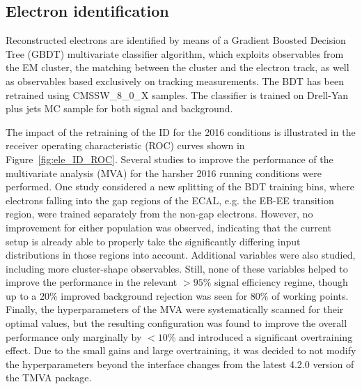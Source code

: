 \subsection{Electron identification}
\label{sec:eleID}

Reconstructed electrons are identified by means of a Gradient Boosted Decision Tree (GBDT) multivariate classifier algorithm, which exploits observables from the EM cluster, the matching between the cluster and the electron track, as well as observables based exclusively on tracking measurements. 
The BDT has been retrained using CMSSW\_8\_0\_X samples. The classifier is trained on Drell-Yan plus jets MC sample for both signal and background.


The impact of the retraining of the ID for the 2016 conditions is illustrated in the receiver operating characteristic (ROC) curves shown in Figure~\ref{fig:ele_ID_ROC}. Several studies to improve the performance of the multivariate analysis (MVA) for the harsher 2016 running conditions were performed. 
One study considered a new splitting of the BDT training bins, where electrons falling into the gap regions of the ECAL, e.g. the EB-EE transition region, were trained separately from the non-gap electrons. 
However, no improvement for either population was observed, indicating that the current setup is already able to properly take the significantly differing input distributions in those regions into account. 
Additional variables were also studied, including more cluster-shape observables. 
Still, none of these variables helped to improve the performance in the relevant $>95\%$ signal efficiency regime, though up to a $20\%$ improved background rejection was seen for $80\%$ of working points. 
Finally, the hyperparameters of the MVA were systematically scanned for their optimal values, but the resulting configuration was found to improve the overall performance only marginally by $<10\%$ and introduced a significant overtraining effect. 
Due to the small gains and large overtraining, it was decided to not modify the hyperparameters beyond the interface changes from the latest 4.2.0 version of the TMVA package.

